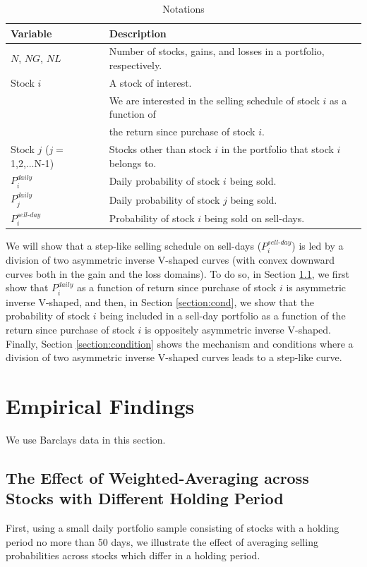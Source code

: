 \documentclass[11pt, a4paper]{article}
\begin{document}
\begin{table}[H]
	\label{table:notations}
	\caption{Notations}
	\centering
	\small
	\begin{tabular}{l l} 
		\hline
		Variable &\:\:\:\:\:\:\:\:\:\:\:\: Description \\
		\hline
		$N$, $NG$, $NL$ & Number of stocks, gains, and losses in a portfolio, respectively.\\
		Stock $i$ & A stock of interest. \\
		& We are interested in the selling schedule of stock $i$ as a function of\\
		& the return since purchase of stock $i$.\\
		Stock $j$ ($j=${1,2,...N-1})& Stocks other than stock $i$ in the portfolio that stock $i$ belongs to.\\
		$P^{daily}_{i}$ & Daily probability of stock $i$ being sold. \\
		$P^{daily}_{j}$ & Daily probability of stock $j$ being sold. \\
		$P^{sell\mbox{-}day}_{i}$ & Probability of stock $i$ being sold on sell-days.\\
		\hline
	\end{tabular}
\end{table}

We will show that a step-like selling schedule on sell-days ($P^{sell\mbox{-}day}_{i}$) is led by a division of two asymmetric inverse V-shaped curves (with convex downward curves both in the gain and the loss domains). To do so, in Section \ref{section:ave}, we first show that $P^{daily}_{i}$ as a function of return since purchase of stock $i$ is asymmetric inverse V-shaped, and then, in Section \ref{section:cond}, we show that the probability of stock $i$ being included in a sell-day portfolio as a function of the return since purchase of stock $i$ is oppositely asymmetric inverse V-shaped. Finally, Section \ref{section:condition} shows the mechanism and conditions where a division of two asymmetric inverse V-shaped curves leads to a step-like curve. 

\section{Empirical Findings}
We use Barclays data in this section. 

\subsection{The Effect of Weighted-Averaging across Stocks with Different Holding Period}
\label{section:ave}
First, using a small daily portfolio sample consisting of stocks with a holding period no more than 50 days, we illustrate the effect of averaging selling probabilities across stocks which differ in a holding period.
\end{document}
